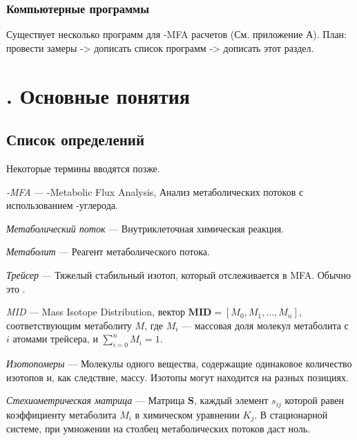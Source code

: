 \documentclass[14pt, a4paper]{extreport}
\begin{document}
	






\clearpage
\subsection{Компьютерные программы}
Существует несколько программ для -MFA расчетов (См. приложение А). 
План: провести замеры -> дописать список программ -> дописать этот раздел.

\chapter[Основные понятия]{\thechapter{}. Основные понятия}
\section{Список определений}
Некоторые термины вводятся позже.

\hangindent=1cm \noindent
\emph{-MFA} --- -Metabolic Flux Analysis, Анализ метаболических потоков с использованием -углерода.

\hangindent=1cm \noindent
\emph{Метаболический поток} --- Внутриклеточная химическая реакция.

\hangindent=1cm \noindent
\emph{Метаболит} --- Реагент метаболического потока.

\hangindent=1cm \noindent
\emph{Трейсер} --- Тяжелый стабильный изотоп, который отслеживается в MFA. Обычно это .

\hangindent=1cm \noindent
\emph{MID} --- Mass Isotope Distribution, вектор $\boldsymbol{M\!I\!D} = [M_0, M_1, \ldots, M_n]$, соответствующим метаболиту $M$, где $M_i$ --- массовая доля молекул метаболита с $i$ атомами трейсера, и $\sum_{i = 0}^{n} M_i = 1$.

\hangindent=1cm \noindent
\emph{Изотопомеры} --- Молекулы одного вещества, содержащие одинаковое количество изотопов и, как следствие, массу. Изотопы могут находится на разных позициях.

\hangindent=1cm \noindent
\emph{Стехиометрическая матрица} --- Матрица $\boldsymbol{S}$, каждый элемент $s_{ij}$ которой равен коэффициенту метаболита $M_i$ в химическом уравнении $K_j$. В стационарной системе, при умножении на столбец метаболических потоков даст ноль.
\end{document}
